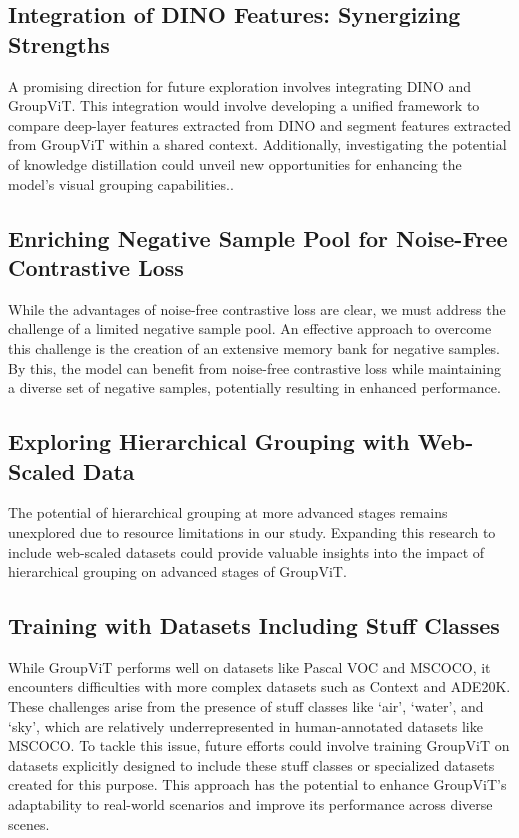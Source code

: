 \subsection{Integration of DINO Features: Synergizing Strengths}
A promising direction for future exploration involves integrating DINO and GroupViT. This integration would involve developing a unified framework to compare deep-layer features extracted from DINO and segment features extracted from GroupViT within a shared context. Additionally, investigating the potential of knowledge distillation could unveil new opportunities for enhancing the model's visual grouping capabilities..

\subsection{Enriching Negative Sample Pool for Noise-Free Contrastive Loss}
While the advantages of noise-free contrastive loss are clear, we must address the challenge of a limited negative sample pool. An effective approach to overcome this challenge is the creation of an extensive memory bank for negative samples. By this, the model can benefit from noise-free contrastive loss while maintaining a diverse set of negative samples, potentially resulting in enhanced performance.

\subsection{Exploring Hierarchical Grouping with Web-Scaled Data}
The potential of hierarchical grouping at more advanced stages remains unexplored due to resource limitations in our study. Expanding this research to include web-scaled datasets could provide valuable insights into the impact of hierarchical grouping on advanced stages of GroupViT.

\subsection{Training with Datasets Including Stuff Classes}
While GroupViT performs well on datasets like Pascal VOC and MSCOCO, it encounters difficulties with more complex datasets such as Context and ADE20K. These challenges arise from the presence of stuff classes like `air', `water', and `sky', which are relatively underrepresented in human-annotated datasets like MSCOCO. To tackle this issue, future efforts could involve training GroupViT on datasets explicitly designed to include these stuff classes or specialized datasets created for this purpose. This approach has the potential to enhance GroupViT's adaptability to real-world scenarios and improve its performance across diverse scenes. 

